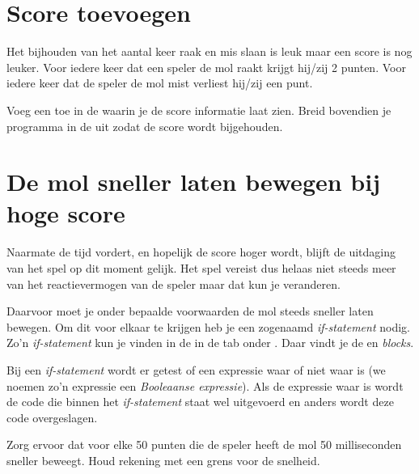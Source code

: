 \section{Score toevoegen}
Het bijhouden van het aantal keer raak en mis slaan is leuk maar een score is nog leuker. Voor iedere keer dat een speler de mol raakt krijgt hij/zij 2 punten. Voor iedere keer dat de speler de mol mist verliest hij/zij een punt. 

\begin{opgave}
    \opgVraag
	Voeg een  toe in de  waarin je de score informatie laat zien. Breid bovendien je programma in de  uit zodat de score wordt bijgehouden. 
\end{opgave}


\section{De mol sneller laten bewegen bij hoge score}
Naarmate de tijd vordert, en hopelijk de score hoger wordt, blijft de uitdaging van het spel op dit moment gelijk. Het spel vereist dus helaas niet steeds meer van het reactievermogen van de speler maar dat kun je veranderen.

Daarvoor moet je onder bepaalde voorwaarden de mol steeds sneller laten bewegen. Om dit voor elkaar te krijgen heb je een zogenaamd \emph{if-statement} nodig. Zo'n \emph{if-statement} kun je vinden in de  in de tab  onder . Daar vindt je de  en  \emph{blocks}.

Bij een \emph{if-statement} wordt er getest of een expressie waar of niet waar is (we noemen zo'n expressie een \emph{Booleaanse expressie}). Als de expressie waar is wordt de code die binnen het \emph{if-statement} staat wel uitgevoerd en anders wordt deze code overgeslagen.

\begin{opgave}
    \opgVraag
	Zorg ervoor dat voor elke 50 punten die de speler heeft de mol 50 milliseconden sneller beweegt. Houd rekening met een grens voor de snelheid.
\end{opgave}

